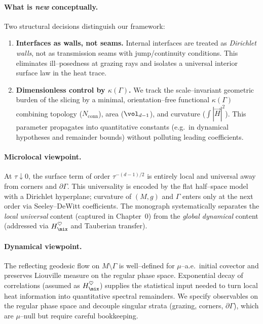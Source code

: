 \paragraph{What is \emph{new} conceptually.}
Two structural decisions distinguish our framework:
\begin{enumerate}
  \item \textbf{Interfaces as walls, not seams.}
  Internal interfaces are treated as \emph{Dirichlet walls}, not as transmission seams with jump/continuity conditions. This eliminates ill–posedness at grazing rays and isolates a universal interior surface law in the heat trace.
  \item \textbf{Dimensionless control by $\kappa(\Gamma)$.}
  We track the scale–invariant geometric burden of the slicing by a minimal, orientation–free functional
  $\kappa(\Gamma)$ combining topology ($N_{\mathrm{conn}}$), area ($\vol_{d-1}$), and curvature ($\int|\vec H|^2$).
  This parameter propagates into quantitative constants (e.g.\ in dynamical hypotheses and remainder bounds) without polluting leading coefficients.
\end{enumerate}

\paragraph{Microlocal viewpoint.}
At $\tau\downarrow 0$, the surface term of order $\tau^{-(d-1)/2}$ is entirely local and universal away from corners and $\partial\Gamma$.
This universality is encoded by the flat half–space model with a Dirichlet hyperplane; curvature of $(M,g)$ and $\Gamma$ enters only at the next order via Seeley–DeWitt coefficients. The monograph
systematically separates the \emph{local universal} content (captured in Chapter~0) from the \emph{global dynamical} content (addressed via $H_{\mix}^\heartsuit$ and Tauberian transfer).

\paragraph{Dynamical viewpoint.}
The reflecting geodesic flow on $M\setminus\Gamma$ is well–defined for $\mu$–a.e.\ initial covector and preserves Liouville measure on the regular phase space.
Exponential decay of correlations (assumed as $H_{\mix}^\heartsuit$) supplies the statistical input needed to turn local heat information into quantitative spectral remainders.
We specify observables on the regular phase space and decouple singular strata (grazing, corners, $\partial\Gamma$), which are $\mu$–null but require careful bookkeeping.

